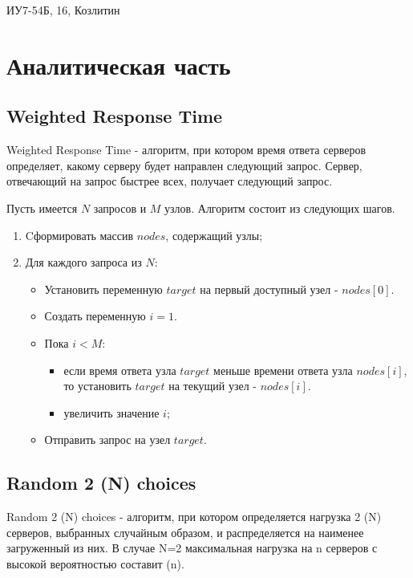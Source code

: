 ИУ7-54Б, 16\textunderscore{}, Козлитин

\chapter{Аналитическая часть}

\section{Weighted Response Time}

Weighted Response Time - алгоритм, при котором время ответа серверов определяет, какому серверу будет направлен следующий запрос.
Сервер, отвечающий на запрос быстрее всех, получает следующий запрос. \cite{sdnlb}

Пусть имеется $N$ запросов и $M$ узлов. Алгоритм состоит из следующих шагов.

\begin{enumerate}
    \item Cформировать массив $nodes$, содержащий узлы;
    \item Для каждого запроса из $N$:
    \begin{itemize}
        \item Установить переменную $target$ на первый доступный узел - $nodes[0]$.
	    \item Создать переменную $i = 1$.
        \item Пока $i < M$:
        \begin{itemize}
            \item если время ответа узла $target$ меньше времени ответа узла $nodes[i]$, то установить $target$ на текущий узел - $nodes[i]$.
		    \item увеличить значение $i$;
        \end{itemize}
        \item Отправить запрос на узел $target$.
	\end{itemize}
\end{enumerate}

\section{Random 2 (N) choices}

Random 2 (N) choices -  алгоритм, при котором определяется нагрузка 2 (N) серверов, выбранных случайным образом, и распределяется на наименее загруженный из них. 
В случае N=2 максимальная нагрузка на n серверов с высокой вероятностью составит \Theta(\log  \log n). \cite{pwr2choices}

